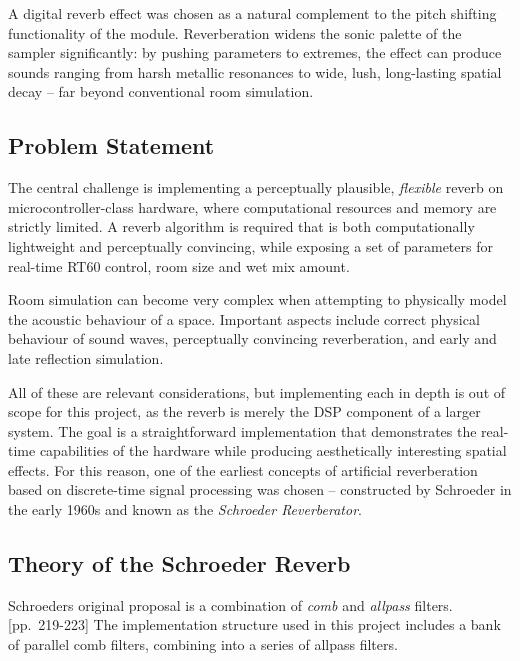 A digital reverb effect was chosen as a natural complement to the pitch shifting functionality of the module. 
Reverberation widens the sonic palette of the sampler significantly: 
by pushing parameters to extremes, the effect can produce sounds ranging from harsh metallic resonances to wide, lush, long-lasting spatial decay -- far beyond conventional room simulation.

\subsection{Problem Statement}

The central challenge is implementing a perceptually plausible, \textit{flexible} reverb on microcontroller-class hardware, where computational resources and memory are strictly limited. 
A reverb algorithm is required that is both computationally lightweight and perceptually convincing, while exposing a set of parameters for real-time RT60 control, room size and wet mix amount.


Room simulation can become very complex when attempting to physically model the acoustic behaviour of a space. Important aspects include correct physical behaviour of sound waves, perceptually convincing reverberation, and early and late reflection simulation. \cite[pp.~87-95]{juliuso.smithPhysicalSignalProcessing}

All of these are relevant considerations, but implementing each in depth is out of scope for this project, as the reverb is merely the DSP component of a larger system. 
The goal is a straightforward implementation that demonstrates the real-time capabilities of the hardware while producing aesthetically interesting spatial effects. 
For this reason, one of the earliest concepts of artificial reverberation based on discrete-time signal processing was chosen -- constructed by Schroeder in the early 1960s and known as the \textit{Schroeder Reverberator}.

\subsection{Theory of the Schroeder Reverb}

Schroeders original proposal is a combination of \textit{comb} and \textit{allpass} filters. \cite{m.r.schroederJournalAudioEngineering1962}[pp.~219-223]
The implementation structure used in this project includes a bank of parallel comb filters, combining into a series of allpass filters.

